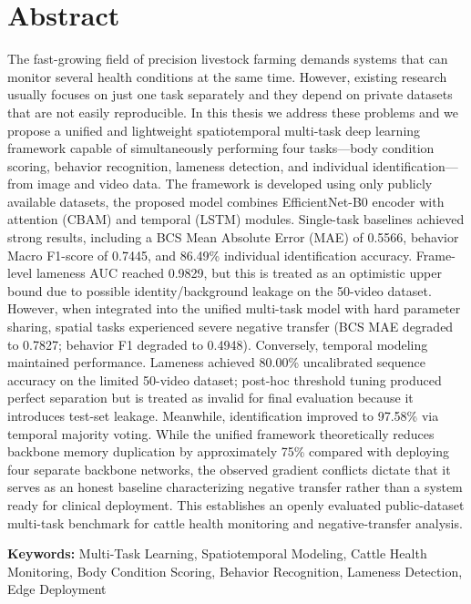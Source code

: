 \section*{Abstract}

The fast-growing field of precision livestock farming demands systems that can monitor several health conditions at the same time. However, existing research usually focuses on just one task separately and they depend on private datasets that are not easily reproducible. In this thesis we address these problems and we propose a unified and lightweight spatiotemporal multi-task deep learning framework capable of simultaneously performing four tasks---body condition scoring, behavior recognition, lameness detection, and individual identification---from image and video data. The framework is developed using only publicly available datasets, the proposed model combines EfficientNet-B0 encoder with attention (CBAM) and temporal (LSTM) modules. Single-task baselines achieved strong results, including a BCS Mean Absolute Error (MAE) of 0.5566, behavior Macro F1-score of 0.7445, and 86.49\% individual identification accuracy. Frame-level lameness AUC reached 0.9829, but this is treated as an optimistic upper bound due to possible identity/background leakage on the 50-video dataset. However, when integrated into the unified multi-task model with hard parameter sharing, spatial tasks experienced severe negative transfer (BCS MAE degraded to 0.7827; behavior F1 degraded to 0.4948). Conversely, temporal modeling maintained performance. Lameness achieved 80.00\% uncalibrated sequence accuracy on the limited 50-video dataset; post-hoc threshold tuning produced perfect separation but is treated as invalid for final evaluation because it introduces test-set leakage. Meanwhile, identification improved to 97.58\% via temporal majority voting. While the unified framework theoretically reduces backbone memory duplication by approximately 75\% compared with deploying four separate backbone networks, the observed gradient conflicts dictate that it serves as an honest baseline characterizing negative transfer rather than a system ready for clinical deployment. This establishes an openly evaluated public-dataset multi-task benchmark for cattle health monitoring and negative-transfer analysis.

\vspace{1cm}
\noindent \textbf{Keywords:} Multi-Task Learning, Spatiotemporal Modeling, Cattle Health Monitoring, Body Condition Scoring, Behavior Recognition, Lameness Detection, Edge Deployment
\pagebreak